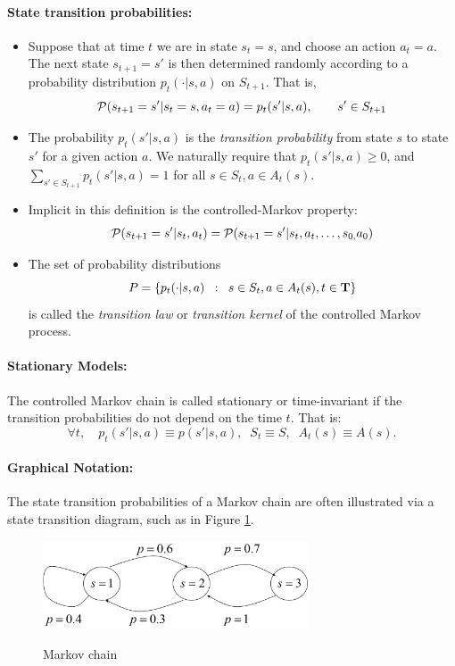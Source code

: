 \paragraph{State transition probabilities:}
\begin{itemize}
\item 	Suppose that at time $t$ we are in state ${s_t} = s$, and choose an action ${a_t} = a$. The next state ${s_{t + 1}} = s'$ is then determined randomly according to a probability distribution  ${p_t}( \cdot |s,a)$ on ${S_{t + 1}}$. That is,
\[{\cal P}({s_{t + 1}} = s'|{s_t} = s,{a_t} = a) = {p_t}(s'|s,a),\quad      \quad s' \in {S_{t + 1}}\]
\item 	The probability ${p_t}(s'|s,a)$ is the \emph{transition probability} from state $s$ to state $s'$ for a given action $a$. We naturally require that
            ${p_t}(s'|s,a) \ge 0$, and $\sum\nolimits_{s' \in {S_{t + 1}}}^{} {{p_t}(s'|s,a)}  = 1$ for all $s \in {S_t},a \in {A_t}(s)$.
\item 	Implicit in this definition is the controlled-Markov property:
\[{\cal P}({s_{t + 1}} = s'|{s_t},{a_t}) = {\cal P}({s_{t + 1}} = s'|{s_t},{a_t}, \ldots ,{s_{0,}}{a_0})\]
\item 	The set of probability distributions
                                \[P = \{ {p_t}( \cdot |s,a)\;\;:\;\;s \in {S_t},a \in {A_t}(s),t \in {\bf{T}}\} \]
is called the \emph{transition law} or \emph{transition kernel} of the controlled Markov process.
\end{itemize}

\paragraph{Stationary Models:}
 	The controlled Markov chain is called stationary or time-invariant if the transition probabilities do not depend on the time $t$. That is:
                     \[\forall t,\quad {p_t}(s'|s,a) \equiv p(s'|s,a),\;\;{S_t} \equiv S,\;\;{A_t}(s) \equiv A(s).\]

\paragraph{Graphical Notation:}
The state transition probabilities of a Markov chain are often illustrated via a state transition diagram, such as in Figure \ref{fig:MC}.

\begin{figure}
  \begin{centering}
  \includegraphics[width=0.7\textwidth]{lecture4_a}\\
  \caption{Markov chain}\label{fig:MC}
  \end{centering}
\end{figure}

